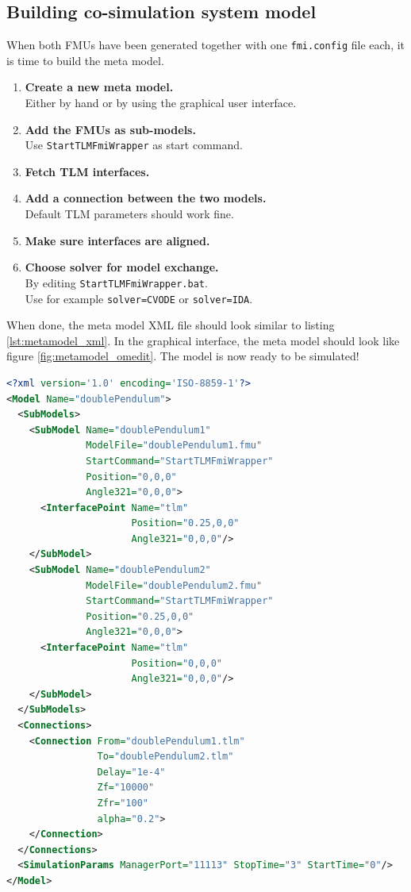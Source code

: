 \subsection{Building co-simulation system model}

When both FMUs have been generated together with one \texttt{fmi.config} file each, it is time to build the meta model.
\begin{enumerate}
\item \textbf{Create a new meta model.}\\
             Either by hand or by using the graphical user interface.
\item \textbf{Add the FMUs as sub-models.}\\
              Use \texttt{StartTLMFmiWrapper} as start command.
\item \textbf{Fetch TLM interfaces.}
\item \textbf{Add a connection between the two models.}\\
              Default TLM parameters should work fine.
\item \textbf{Make sure interfaces are aligned.}
\item \textbf{Choose solver for model exchange.}\\
              By editing \texttt{StartTLMFmiWrapper.bat}.\\
              Use for example \texttt{solver=CVODE} or \texttt{solver=IDA}.
\end{enumerate}

When done, the meta model XML file should look similar to listing \ref{lst:metamodel_xml}.
In the graphical interface, the meta model should look like figure \ref{fig:metamodel_omedit}.
The model is now ready to be simulated!

\begin{lstlisting}[language=xml,float,floatplacement=ht,label={lst:metamodel_xml},caption=XML description of the complete meta model]
<?xml version='1.0' encoding='ISO-8859-1'?>
<Model Name="doublePendulum">
  <SubModels>
    <SubModel Name="doublePendulum1" 
              ModelFile="doublePendulum1.fmu"
              StartCommand="StartTLMFmiWrapper" 
              Position="0,0,0" 
              Angle321="0,0,0">
      <InterfacePoint Name="tlm" 
                      Position="0.25,0,0" 
                      Angle321="0,0,0"/>
    </SubModel>
    <SubModel Name="doublePendulum2" 
              ModelFile="doublePendulum2.fmu" 
              StartCommand="StartTLMFmiWrapper" 
              Position="0.25,0,0"  
              Angle321="0,0,0">
      <InterfacePoint Name="tlm" 
                      Position="0,0,0" 
                      Angle321="0,0,0"/>
    </SubModel>
  </SubModels>
  <Connections>
    <Connection From="doublePendulum1.tlm" 
                To="doublePendulum2.tlm" 
                Delay="1e-4" 
                Zf="10000"   
                Zfr="100"
                alpha="0.2">
    </Connection>
  </Connections>
  <SimulationParams ManagerPort="11113" StopTime="3" StartTime="0"/>
</Model>
\end{lstlisting}

